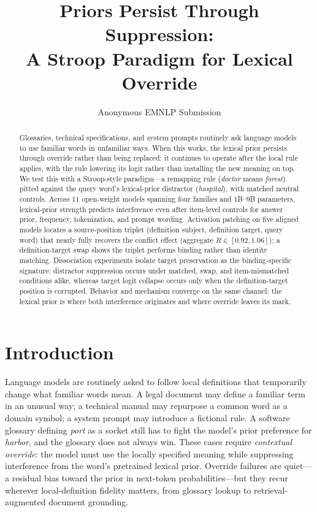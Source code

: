 \documentclass[11pt]{article}
\title{Priors Persist Through Suppression:\\A Stroop Paradigm for Lexical Override}
\author{Anonymous EMNLP Submission}
\begin{document}
\maketitle

\begin{abstract}
Glossaries, technical specifications, and system prompts routinely ask language models to use
familiar words in unfamiliar ways. When this works, the lexical prior persists through
override rather than being replaced: it continues to operate after the local rule applies,
with the rule lowering its logit rather than installing the new meaning on top. We test this
with a Stroop-style paradigm---a remapping rule (\textit{doctor} means \textit{forest}) pitted
against the query word's lexical-prior distractor (\textit{hospital}), with matched neutral
controls. Across $11$ open-weight models spanning four families and $1$B--$9$B parameters,
lexical-prior strength predicts interference even after item-level controls for answer prior,
frequency, tokenization, and prompt wording. Activation patching on five aligned models locates a source-position triplet (definition
subject, definition target, query word) that nearly fully recovers the conflict effect
(aggregate $R \in [0.92, 1.06]$); a definition-target swap shows the triplet performs binding
rather than identity matching. Dissociation experiments isolate target preservation as the
binding-specific signature: distractor suppression occurs under matched, swap, and
item-mismatched conditions alike, whereas target logit collapse occurs only when the
definition-target position is corrupted. Behavior and mechanism converge on the same channel:
the lexical prior is where both interference originates and where override leaves its mark.
\end{abstract}


\section{Introduction}
\label{sec:intro}

Language models are routinely asked to follow local definitions that temporarily change
what familiar words mean. A legal document may define a familiar term in an unusual way; a
technical manual may repurpose a common word as a domain symbol; a system prompt may introduce
a fictional rule. A software glossary defining \emph{port} as a socket still has to fight the
model's prior preference for \emph{harbor}, and the glossary does not always win. These cases require \emph{contextual override}: the model must use the
locally specified meaning while suppressing interference from the word's pretrained lexical
prior. Override failures are quiet---a residual bias toward the prior in next-token
probabilities---but they recur wherever local-definition fidelity matters, from glossary
lookup to retrieval-augmented document grounding.
\end{document}
